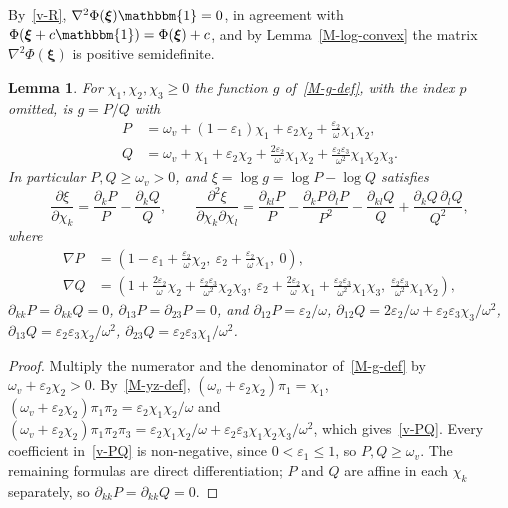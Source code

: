 \documentclass[11pt]{article}
\theoremstyle{plain}
\newtheorem{lemma}[theorem]{Lemma}
\theoremstyle{remark}
\numberwithin{equation}{section}
\begin{document}
By~\eqref{v-R}, $\nabla^2\Phi(\bm\xi)\mathbbm{1}=0$, in agreement with
$\Phi(\bm\xi+c\mathbbm{1})=\Phi(\bm\xi)+c$, and by Lemma~\ref{M-log-convex} the
matrix $\nabla^2\Phi(\bm\xi)$ is positive semidefinite.

\begin{lemma}\label{v-g}
For $\chi_1,\chi_2,\chi_3\ge 0$ the function $g$ of~\eqref{M-g-def}, with the
index $p$ omitted, is $g=P/Q$ with
\begin{equation}\label{v-PQ}
\begin{aligned}
P&=\omega_v+(1-\varepsilon_1)\chi_1+\varepsilon_2\chi_2+\frac{\varepsilon_2}{\omega}\chi_1\chi_2,\\
Q&=\omega_v+\chi_1+\varepsilon_2\chi_2+\frac{2\varepsilon_2}{\omega}\chi_1\chi_2
+\frac{\varepsilon_2\varepsilon_3}{\omega^2}\chi_1\chi_2\chi_3 .
\end{aligned}
\end{equation}
In particular $P,Q\ge\omega_v>0$, and $\xi=\log g=\log P-\log Q$ satisfies
\begin{equation}\label{v-logg}
\frac{\partial\xi}{\partial\chi_k}=\frac{\partial_kP}{P}-\frac{\partial_kQ}{Q},\qquad
\frac{\partial^2\xi}{\partial\chi_k\partial\chi_l}
=\frac{\partial_{kl}P}{P}-\frac{\partial_kP\,\partial_lP}{P^2}
-\frac{\partial_{kl}Q}{Q}+\frac{\partial_kQ\,\partial_lQ}{Q^2},
\end{equation}
where
\begin{equation}\label{v-PQ-derivs}
\begin{aligned}
\nabla P&=\left(1-\varepsilon_1+\frac{\varepsilon_2}{\omega}\chi_2,\
\varepsilon_2+\frac{\varepsilon_2}{\omega}\chi_1,\ 0\right),\\
\nabla Q&=\left(1+\frac{2\varepsilon_2}{\omega}\chi_2+\frac{\varepsilon_2\varepsilon_3}{\omega^2}\chi_2\chi_3,\
\varepsilon_2+\frac{2\varepsilon_2}{\omega}\chi_1+\frac{\varepsilon_2\varepsilon_3}{\omega^2}\chi_1\chi_3,\
\frac{\varepsilon_2\varepsilon_3}{\omega^2}\chi_1\chi_2\right),
\end{aligned}
\end{equation}
$\partial_{kk}P=\partial_{kk}Q=0$, $\partial_{13}P=\partial_{23}P=0$, and
$\partial_{12}P=\varepsilon_2/\omega$,
$\partial_{12}Q=2\varepsilon_2/\omega+\varepsilon_2\varepsilon_3\chi_3/\omega^2$,
$\partial_{13}Q=\varepsilon_2\varepsilon_3\chi_2/\omega^2$,
$\partial_{23}Q=\varepsilon_2\varepsilon_3\chi_1/\omega^2$.
\end{lemma}
\begin{proof}
Multiply the numerator and the denominator of~\eqref{M-g-def} by
$\omega_v+\varepsilon_2\chi_2>0$. By~\eqref{M-yz-def},
$\left(\omega_v+\varepsilon_2\chi_2\right)\pi_1=\chi_1$,
$\left(\omega_v+\varepsilon_2\chi_2\right)\pi_1\pi_2=\varepsilon_2\chi_1\chi_2/\omega$ and
$\left(\omega_v+\varepsilon_2\chi_2\right)\pi_1\pi_2\pi_3
=\varepsilon_2\chi_1\chi_2/\omega+\varepsilon_2\varepsilon_3\chi_1\chi_2\chi_3/\omega^2$,
which gives~\eqref{v-PQ}. Every coefficient in~\eqref{v-PQ} is non-negative,
since $0<\varepsilon_1\le 1$, so $P,Q\ge\omega_v$. The remaining formulas are
direct differentiation; $P$ and $Q$ are affine in each $\chi_k$ separately,
so $\partial_{kk}P=\partial_{kk}Q=0$.
\end{proof}
\end{document}
